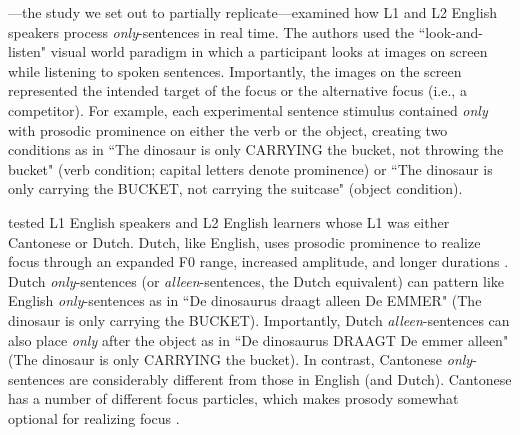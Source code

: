 \cite{ge2021a}---the study we set out to partially replicate---examined how L1 and L2 English speakers process \textit{only}-sentences in real time. The authors used the “look-and-listen" visual world paradigm in which a participant looks at images on screen while listening to spoken sentences. Importantly, the images on the screen represented the intended target of the focus or the alternative focus (i.e., a competitor). For example, each experimental sentence stimulus contained \textit{only} with prosodic prominence on either the verb or the object, creating two conditions as in ``The dinosaur is only CARRYING the bucket, not throwing the bucket" (verb condition; capital letters denote prominence) or ``The dinosaur is only carrying the BUCKET, not carrying the suitcase" (object condition).

\cite{ge2021a} tested L1 English speakers and L2 English learners whose L1 was either Cantonese or Dutch. Dutch, like English, uses prosodic prominence to realize focus through an expanded F0 range, increased amplitude, and longer durations \parencite{dimitrova2010focus}. Dutch \textit{only}-sentences (or \textit{alleen}-sentences, the Dutch equivalent) can pattern like English \textit{only}-sentences as in ``De dinosaurus draagt alleen De EMMER" (The dinosaur is only carrying the BUCKET). Importantly, Dutch \textit{alleen}-sentences can also place \textit{only} after the object as in ``De dinosaurus DRAAGT De emmer alleen" (The dinosaur is only CARRYING the bucket). In contrast, Cantonese \textit{only}-sentences are considerably different from those in English (and Dutch). Cantonese has a number of different focus particles, which makes prosody somewhat optional for realizing focus \parencite{lee2019focus, wu2010prosodic, ge2024bilingual, fung2000final}. 

